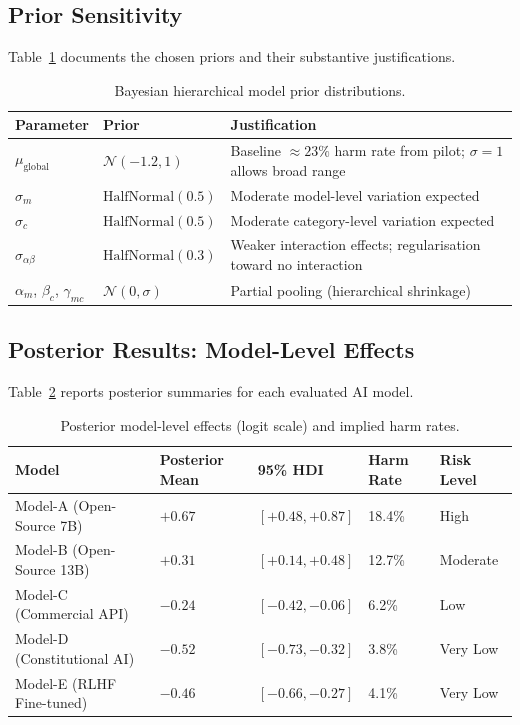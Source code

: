 \documentclass[10pt,letterpaper]{article}
\begin{document}
\subsection{Prior Sensitivity}

Table~\ref{tab:priors} documents the chosen priors and their substantive
justifications.

\begin{table}[ht]
\centering
\caption{Bayesian hierarchical model prior distributions.}
\label{tab:priors}
\begin{tabular}{lll}
\toprule
Parameter & Prior & Justification \\
\midrule
$\mu_\mathrm{global}$ & $\mathcal{N}(-1.2, 1)$ &
  Baseline ${\approx}23\%$ harm rate from pilot; $\sigma=1$ allows broad range \\
$\sigma_m$ & $\mathrm{HalfNormal}(0.5)$ &
  Moderate model-level variation expected \\
$\sigma_c$ & $\mathrm{HalfNormal}(0.5)$ &
  Moderate category-level variation expected \\
$\sigma_{\alpha\beta}$ & $\mathrm{HalfNormal}(0.3)$ &
  Weaker interaction effects; regularisation toward no interaction \\
$\alpha_m$, $\beta_c$, $\gamma_{mc}$ & $\mathcal{N}(0, \sigma)$ &
  Partial pooling (hierarchical shrinkage) \\
\bottomrule
\end{tabular}
\end{table}

\subsection{Posterior Results: Model-Level Effects}

Table~\ref{tab:posterior_model} reports posterior summaries for each evaluated
AI model.

\begin{table}[ht]
\centering
\caption{Posterior model-level effects (logit scale) and implied harm rates.}
\label{tab:posterior_model}
\begin{tabular}{lllll}
\toprule
Model & Posterior Mean & 95\% HDI & Harm Rate & Risk Level \\
\midrule
Model-A (Open-Source 7B) & $+0.67$ & $[+0.48, +0.87]$ & 18.4\% & High \\
Model-B (Open-Source 13B) & $+0.31$ & $[+0.14, +0.48]$ & 12.7\% & Moderate \\
Model-C (Commercial API) & $-0.24$ & $[-0.42, -0.06]$ & 6.2\% & Low \\
Model-D (Constitutional AI) & $-0.52$ & $[-0.73, -0.32]$ & 3.8\% & Very Low \\
Model-E (RLHF Fine-tuned) & $-0.46$ & $[-0.66, -0.27]$ & 4.1\% & Very Low \\
\bottomrule
\end{tabular}
\end{table}
\end{document}
